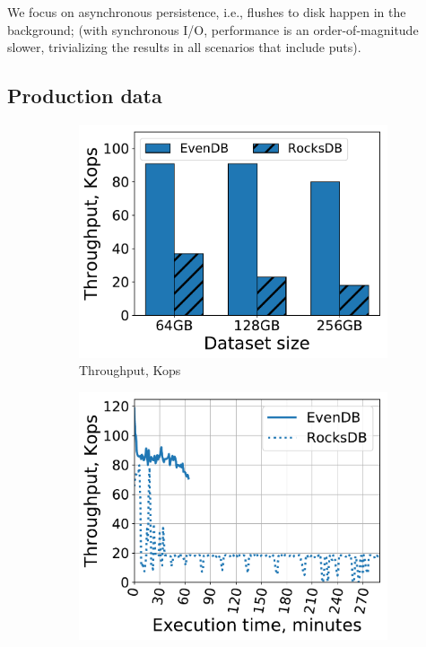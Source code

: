We focus on asynchronous persistence,  i.e., flushes to disk happen in the background; 
(with synchronous I/O, performance is an order-of-magnitude slower, trivializing the results 
in all scenarios that include puts). 


\subsection{Production data}
\label{ssec:prod}

\begin{figure}[tb]
\centering
\begin{subfigure}{0.29\linewidth}
\includegraphics[width=\textwidth]{figs/ingestion.pdf}
\caption{Throughput, Kops}
\label{fig:prod:ingestion:a}
\end{subfigure}
\hspace{0.03\linewidth} 
\begin{subfigure}{0.29\linewidth}
\includegraphics[width=\textwidth]{figs/throughput_256_ingestions_line.pdf}

\end{subfigure}
\end{figure}
